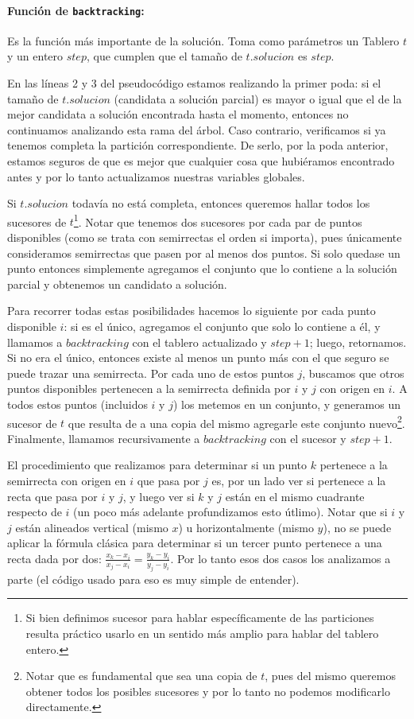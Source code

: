   \paragraph{Función de \texttt{backtracking}:} Es la función más importante de la solución. Toma como parámetros un Tablero $t$ y un entero $step$, que cumplen que el tamaño de $t.solucion$ es $step$.

  En las líneas 2 y 3 del pseudocódigo estamos realizando la primer poda: si el tamaño de $t.solucion$ (candidata a solución parcial) es mayor o igual que el de la mejor candidata a solución encontrada hasta el momento, entonces no continuamos analizando esta rama del árbol. Caso contrario, verificamos si ya tenemos completa la partición correspondiente. De serlo, por la poda anterior, estamos seguros de que es mejor que cualquier cosa que hubiéramos encontrado antes y por lo tanto actualizamos nuestras variables globales. 

  Si $t.solucion$ todavía no está completa, entonces queremos hallar todos los sucesores de $t$\footnote{Si bien definimos sucesor para hablar específicamente de las particiones resulta práctico usarlo en un sentido más amplio para hablar del tablero entero.}. Notar que tenemos dos sucesores por cada par de puntos disponibles (como se trata con semirrectas el orden si importa), pues únicamente consideramos semirrectas que pasen por al menos  dos puntos. Si solo quedase un punto entonces simplemente agregamos el conjunto que lo contiene a la solución parcial y obtenemos un candidato a solución. 

  Para recorrer todas estas posibilidades hacemos lo siguiente por cada punto disponible $i$: si es el único, agregamos el conjunto que solo lo contiene a él, y llamamos a $backtracking$ con el tablero actualizado y $step+1$; luego, retornamos. Si no era el único, entonces existe al menos un punto más con el que seguro se puede trazar una semirrecta. Por cada uno de estos puntos $j$, buscamos que otros puntos disponibles pertenecen a la semirrecta definida por $i$ y $j$ con origen en $i$. A todos estos puntos (incluidos $i$ y $j$) los metemos en un conjunto, y generamos un sucesor de $t$ que resulta de a una copia del mismo agregarle este conjunto nuevo\footnote{Notar que es fundamental que sea una copia de $t$, pues del mismo queremos obtener todos los posibles sucesores y por lo tanto no podemos modificarlo directamente.}. Finalmente, llamamos recursivamente a $backtracking$ con el sucesor y $step+1$.

  El procedimiento que realizamos para determinar si un punto $k$ pertenece a la semirrecta con origen en $i$ que pasa por $j$ es, por un lado ver si pertenece a la recta que pasa por $i$ y $j$, y luego ver si $k$ y $j$ están en el mismo cuadrante respecto de $i$ (un poco más adelante profundizamos esto útlimo). Notar que si $i$ y $j$ están alineados vertical (mismo $x$) u horizontalmente (mismo $y$), no se puede aplicar la fórmula clásica para determinar si un tercer punto pertenece a una recta dada por dos: $\frac{x_k-x_i}{x_j-x_i} = \frac{y_k-y_i}{y_j-y_i}$. Por lo tanto esos dos casos los analizamos a parte (el código usado para eso es muy simple de entender).

